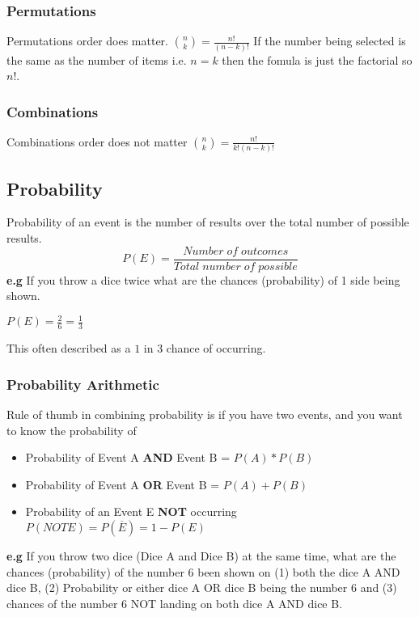 \documentclass{article}
\begin{document}
\subsubsection{Permutations}
Permutations order does matter.
${n\choose k} = \frac{n!}{(n-k)!}$
If the number being selected is the same as the number of items i.e. $n=k$ then the fomula is just the factorial so $n!$.

\subsubsection{Combinations}
Combinations order does not matter
${n\choose k} = \frac{n!}{k!(n-k)!}$

\newpage
\subsection{Probability}
Probability of an event is the number of results over the total number of possible results.
\begin{equation}
P(E) = \frac{Number\;of\;outcomes}{Total\;number\;of\;possible}
\end{equation}
\textbf{e.g}
If you throw a dice twice what are the chances (probability) of 1 side being shown.

$P(E) = \frac{2}{6} = \frac{1}{3}$

This often described as a $1$ in $3$ chance of occurring.

\subsubsection{Probability Arithmetic}
Rule of thumb in combining probability is if you have two events, and you want to know the probability of 
\begin{itemize}
\item Probability of Event A \textbf{AND} Event B =  $P(A) * P(B)$
\item Probability of Event A \textbf{OR} Event B =  $P(A) + P(B)$
\item Probability of an Event E \textbf{NOT} occurring $P(NOT E) = P(\overline{E}) = 1 - P(E)$
\end{itemize}

\textbf{e.g}
If you throw two dice (Dice A and Dice B) at the same time, what are the chances (probability) of the number 6 been shown on (1) both the dice A AND dice B, (2) Probability or either dice A OR dice B being the number 6 and (3) chances of the number 6 NOT landing on both dice A AND dice B.
\end{document}
